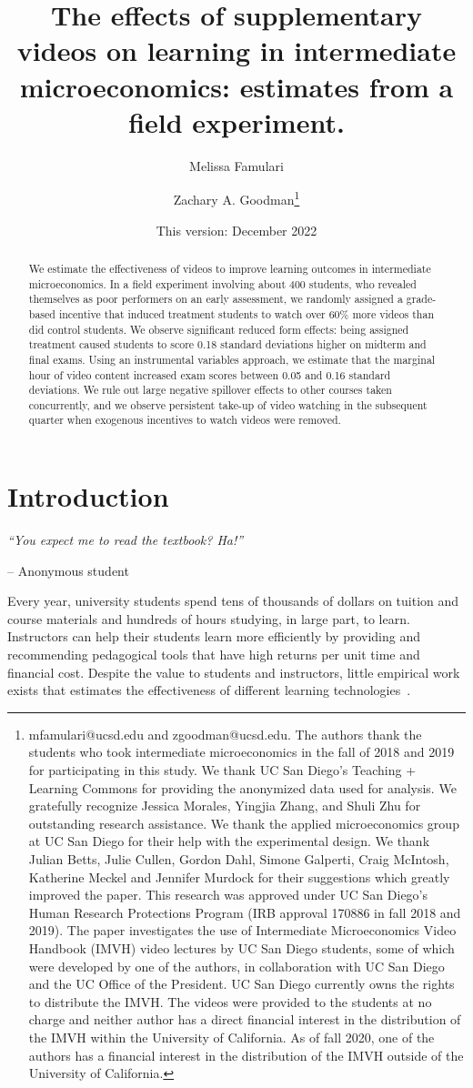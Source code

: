\documentclass[12pt]{article}
\title{The effects of supplementary videos on learning in intermediate microeconomics: estimates from a field experiment.}
\author{Melissa Famulari}
\author{Zachary A. Goodman\thanks{mfamulari@ucsd.edu and zgoodman@ucsd.edu.
The authors thank the students who took intermediate microeconomics in the fall of 2018 and 2019 for participating in this study.
We thank UC San Diego's Teaching + Learning Commons for providing the anonymized data used for analysis.
We gratefully recognize Jessica Morales, Yingjia Zhang, and Shuli Zhu for outstanding research assistance.
We thank the applied microeconomics group at UC San Diego for their help with the experimental design.
We thank Julian Betts, Julie Cullen, Gordon Dahl, Simone Galperti, Craig McIntosh, Katherine Meckel and Jennifer Murdock for their suggestions which greatly improved the paper.
This research was approved under UC San Diego's Human Research Protections Program (IRB approval 170886 in fall 2018 and 2019).
The paper investigates the use of Intermediate Microeconomics Video Handbook (IMVH) video lectures by UC San Diego students, some of which were developed by one of the authors, in collaboration with UC San Diego and the UC Office of the President.
UC San Diego currently owns the rights to distribute the IMVH.
The videos were provided to the students at no charge and neither author has a direct financial interest in the distribution of the IMVH within the University of California.
As of fall 2020, one of the authors has a financial interest in the distribution of the IMVH outside of the University of California.}}
\affil{University of California, San Diego}
\date{This version: December 2022} %
\begin{document}

\maketitle
\begin{abstract}
	We estimate the effectiveness of videos to improve learning outcomes in intermediate microeconomics.
	In a field experiment involving about 400 students, who revealed themselves as poor performers on an early assessment, we randomly assigned a grade-based incentive that induced treatment students to watch over 60\% more videos than did control students.
	We observe significant reduced form effects: being assigned treatment caused students to score 0.18 standard deviations higher on midterm and final exams.
	Using an instrumental variables approach, we estimate that the marginal hour of video content increased exam scores between 0.05 and 0.16 standard deviations.
	We rule out large negative spillover effects to other courses taken concurrently, and we observe persistent take-up of video watching in the subsequent quarter when exogenous incentives to watch videos were removed.
\end{abstract}


\section{Introduction}\label{sec:introduction}

\epigraph{\textit{``You expect me to read the textbook? Ha!''}}{-- Anonymous student}\bigskip

Every year, university students spend tens of thousands of dollars on tuition and course materials and hundreds of hours studying, in large part, to learn.
Instructors can help their students learn more efficiently by providing and recommending pedagogical tools that have high returns per unit time and financial cost.
Despite the value to students and instructors, little empirical work exists that estimates the effectiveness of different learning technologies~\parencite{aws2015}.
\end{document}
